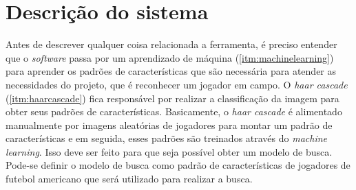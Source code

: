 \section{\textbf{Descrição do sistema}}
\label{descricao-do-sistema}

Antes de descrever qualquer coisa relacionada a ferramenta, é preciso entender que o \textit{software} passa por um aprendizado de máquina (\autoref{itm:machinelearning}) para aprender os padrões de características que são necessária para atender as necessidades do projeto, que é reconhecer um jogador em campo. O \textit{haar cascade} (\autoref{itm:haarcascade}) fica responsável por realizar a classificação da imagem para obter seus padrões de características. Basicamente, o \textit{haar cascade} é alimentado manualmente por imagens aleatórias de jogadores para montar um padrão de características e em seguida, esses padrões são treinados através do \textit{machine learning}. Isso deve ser feito para que seja possível obter um modelo de busca. Pode-se definir o modelo de busca como padrão de características de jogadores de futebol americano que será utilizado para realizar a busca.